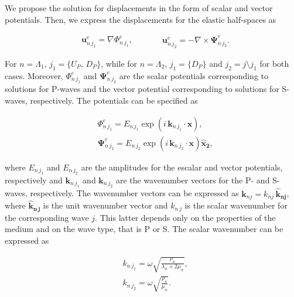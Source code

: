 \documentclass[draft]{agujournal2019}
\begin{document}
We propose the solution for displacements in the form of scalar and vector potentials. Then, we express the displacements for the elastic half-spaces as
\begin{linenomath*}
\begin{equation}\label{Eq.a9}
\begin{aligned}
& \bm{u}_{n\,j_1}^e = \nabla \Phi^e_{n\,j_1},
\end{aligned}
\qquad
\begin{aligned}
& \bm{u}_{n\,j_2}^e = -  \nabla  \times \bm{\Psi}^e_{n\,j_2}.
\end{aligned}
\end{equation}
\end{linenomath*}
For $n =\Lambda_1 $,  $j_1 = \{U_P,\,D_P\}$,  while for $n =\Lambda_2 $, $j_1 = \{D_P\}$ and $j_2=j \setminus j_1$ for both cases. Moreover, $\Phi^e_{n\,j_1}$ and $\bm{\Psi}^e_{n\,j_2}$ are the scalar potentials corresponding to solutions for P-waves and the vector potential corresponding to solutions for S-waves, respectively. The potentials can be specified as
\begin{linenomath*}
\begin{equation}\label{Eq.a10}
\begin{split}
&  \Phi^e_{n\,j_1} = E_{n\,j_1} \exp \left( i\, \bm{k}_{n\, j_1}\cdot \bm{x} \right), \\
& \bm{\Psi}^e_{n\,j_2} =  E_{n\,j_2} \exp \left( i\, \bm{k}_{n\, j_2} \cdot \bm{x} \right) \bm{\hat {x}_2}, 
\end{split}
\end{equation}
\end{linenomath*}
where $E_{n\,j_1}$ and $E_{n\,j_2}$ are the amplitudes for the escalar and vector potentials, respectively and $\bm{k}_{n \,j_1}$ and $\bm{k}_{n\, j_2}$ are the wavenumber vectors for the P- and S-waves, respectively. The wavenumber vectors can be expressed as $\bm{k}_{n j} = k_{nj} \, \bm{\hat {k}_{nj}}$, where $\bm{\hat {k}_{n\, j}}$ is the unit wavenumber vector and $k_{n\,j}$ is the scalar wavenumber for the corresponding wave $j$. This latter depends only on the properties of the medium and on the wave type, that is P or S. The scalar wavenumber can be expressed as
\begin{linenomath*}
\begin{equation}\label{Eq.a11}
\begin{split}
& k_{n\,j_1}  = \omega \sqrt{\frac{\rho_n}{\lambda_n + 2 \mu_n}}, \\[10pt]
& k_{n\,j_2}  = \omega \sqrt{\frac{\rho_n}{ \mu_n}}.
\end{split}
\end{equation}
\end{linenomath*}
\end{document}
